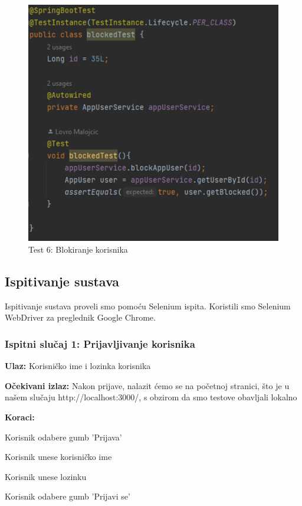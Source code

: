 				\begin{figure}[H]
					\centering
					\includegraphics[width=12cm]{slike/blokiranjeKorisnika}
					\caption{Test 6: Blokiranje korisnika}
					\label{fig:Test-6}
				\end{figure}
			
			\subsection{Ispitivanje sustava}
			
			 Ispitivanje sustava proveli smo pomoću Selenium ispita. Koristili smo Selenium WebDriver za preglednik Google Chrome.
			 
			 \subsubsection{Ispitni slučaj 1: Prijavljivanje korisnika}
			 
			 \begin{packed_item}
			 	
			 	\item \textbf{Ulaz: } Korisničko ime i lozinka korisnika 
			 	\item  \textbf{Očekivani izlaz:} Nakon prijave, nalazit ćemo se na početnoj stranici, što je u našem slučaju http://localhost:3000/, s obzirom da smo testove obavljali lokalno
			 	\item  \textbf{Koraci:}
			 	
			 	\item[] \begin{packed_enum}
			 		
			 		\item Korisnik odabere gumb 'Prijava'
			 		\item Korisnik unese korisničko ime
			 		\item Korisnik unese lozinku
			 		\item Korisnik odabere gumb 'Prijavi se'
			 		
			 	\end{packed_enum}
			 \end{packed_item}
			 
